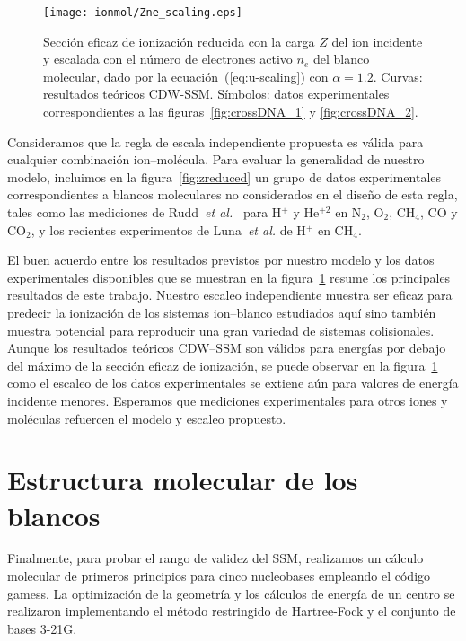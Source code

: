 \begin{figure}[t]
\centering
\texttt{[image: ionmol/Zne\_scaling.eps]}
\caption[Sección eficaz de ionización reducida por $Z$ y $n_e$.]
{Sección eficaz de ionización reducida con la carga $Z$ del ion incidente
y escalada con el número de electrones activo $n_e$ del blanco molecular,
dado por la ecuación~(\ref{eq:u-scaling}) con $\alpha=1.2$. 
Curvas: resultados teóricos CDW-SSM. 
Símbolos: datos experimentales correspondientes a las 
figuras~\ref{fig:crossDNA_1} y \ref{fig:crossDNA_2}.}
\label{fig:zalpha}
\end{figure} 

Consideramos que la regla de escala independiente propuesta es válida 
para cualquier combinación ion--molécula. Para evaluar la generalidad 
de nuestro modelo, incluimos en la figura~\ref{fig:zreduced} un grupo 
de datos experimentales correspondientes a blancos moleculares no 
considerados en el diseño de esta regla, tales como las mediciones de
Rudd~\textit{et al.}~\cite{Rudd:85,Rudd:83} para H$^{+}$ y He$^{+2}$ 
en N$_2$, O$_2$, CH$_4$, CO y CO$_2$, y los recientes experimentos de
Luna~\textit{et al.} \cite{Luna2019} de H$^{+}$ en CH$_4$. 

El buen acuerdo entre los resultados previstos por nuestro modelo y los
datos experimentales disponibles que se muestran en la 
figura~\ref{fig:zalpha} resume los principales resultados de este 
trabajo. Nuestro escaleo independiente muestra ser eficaz para predecir 
la ionización de los sistemas ion--blanco estudiados aquí sino también 
muestra potencial para reproducir una gran variedad de sistemas 
colisionales. Aunque los resultados teóricos CDW--SSM son válidos para
energías por debajo del máximo de la sección eficaz de ionización, se
puede observar en la figura~\ref{fig:zalpha} como el escaleo de los datos 
experimentales se extiene aún para valores de energía incidente menores.
Esperamos que mediciones experimentales para otros iones y moléculas 
refuercen el modelo y escaleo propuesto.

\section{Estructura molecular de los blancos}
\label{sec:molcalculations}

Finalmente, para probar el rango de validez del SSM, realizamos un 
cálculo molecular de primeros principios para cinco nucleobases 
empleando el código {\sc gamess}. La optimización de la geometría y los 
cálculos de energía de un centro se realizaron implementando el método
restringido de Hartree-Fock y el conjunto de bases 3-21G. 

